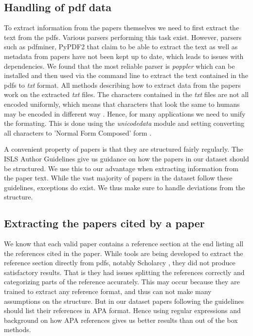 \documentclass[journal,twocolumn]{IEEEtran}
\begin{document}
    \subsection{Handling of pdf data}\label{handling-of-pdf-data}

To extract information from the papers themselves we need to first
extract the text from the pdfs. Various parsers performing this task
exist. However, parsers such as pdfminer, PyPDF2 that claim to be able
to extract the text as well as metadata from papers have not been kept
up to date, which leads to issues with dependencies. We found that the
most reliable parser is \emph{poppler} \cite{poppler} which can be
installed and then used via the command line to extract the text
contained in the pdfs to \emph{txt} format. All methods describing how
to extract data from the papers work on the extracted \emph{txt} files.
The characters contained in the \emph{txt} files are not all encoded
uniformly, which means that characters that look the same to humans may
be encoded in different way . Hence, for many applications we need to
unify the formating. This is done using the \emph{unicodedata} module
and setting converting all characters to 'Normal Form Composed' form .

A convenient property of papers is that they are structured fairly
regularly. The ISLS Author Guidelines \cite{guidelines} give us guidance
on how the papers in our dataset should be structured. We use this to
our advantage when extracting information from the paper text. While the
vast majority of papers in the dataset follow these guidelines,
exceptions do exist. We thus make sure to handle deviations from the
structure.

\subsection{Extracting the papers cited by a
paper}\label{extracting-the-papers-cited-by-a-paper}

We know that each valid paper contains a reference section at the end
listing all the references cited in the paper. While tools are being
developed to extract the reference section directly from pdfs, notably
Scholarcy \cite{scholarcy}, they did not produce satisfactory results.
That is they had issues splitting the references correctly and
categorizing parts of the reference accurately. This may occur because
they are trained to extract any reference format, and thus can not make
many assumptions on the structure. But in our dataset papers following
the guidelines should list their references in APA format. Hence using
regular expressions and background on how APA references gives us better
results than out of the box methods.
\end{document}
